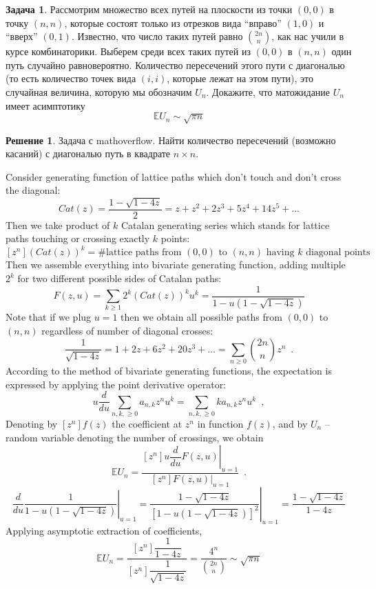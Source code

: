 \documentclass[a5paper]{article}
\theoremstyle{definition}
\newtheorem{problem}{Задача}
\newtheorem*{solution}{Решение}
\begin{document}
\begin{problem}
Рассмотрим множество всех путей на плоскости из точки \( (0,0) \) в точку \(
(n,n) \), которые состоят только из отрезков вида ``вправо'' \( (1,0) \) и ``вверх'' \(
(0,1) \). Известно, что число таких путей равно \( {2n \choose n} \), как нас
учили в курсе комбинаторики. Выберем среди всех таких путей из \( (0,0) \) в \(
(n,n) \) один путь случайно равновероятно. Количество пересечений этого пути с
диагональю (то есть количество точек вида \( (i,i) \), которые лежат на этом
пути), это случайная величина, которую мы обозначим \( U_n \). Докажите, что
матожидание \( U_n \) имеет асимптотику
\begin{equation}
    \mathbb E U_n \sim \sqrt{\pi n}
\end{equation}
\end{problem}

\begin{solution}
Задача с mathoverflow. Найти количество пересечений (возможно касаний) с
диагональю путь в квадрате \( n \times n \).               

Consider generating function of lattice paths which don't touch and don't cross the diagonal:
$$
    Cat(z) = \dfrac{1 - \sqrt{1 - 4z}}{2} = z + z^2 + 2z^3 + 5z^4 + 14z^5 + \ldots
$$
Then we take product of $ k $ Catalan generating series which stands for lattice paths touching or crossing exactly $ k$ points:
$$
    [z^n] (Cat(z))^k = \text{\# lattice paths from $(0,0)$ to $(n,n)$ having $k$ diagonal points}
$$
Then we assemble everything into bivariate generating function, adding multiple $2^k$ for two different possible sides of Catalan paths:
$$
    F(z,u) = \sum_{k \geq 1} 2^k(Cat(z))^k u^k = \dfrac{1}{1 - u(1 - \sqrt{1-4z})}
$$
Note that if we plug $u=1$ then we obtain all possible paths from $(0,0)$ to $(n,n)$ regardless of number of diagonal crosses:
$$
    \dfrac{1}{\sqrt{1-4z}} = 1 + 2z + 6z^2 + 20z^3 + \ldots = \sum_{n \geq 0} {2n \choose n} z^n \enspace .
$$
According to the method of bivariate generating functions, the expectation is expressed by applying the point derivative operator:
$$
    u \dfrac{d}{du} \sum_{n, k, \geq 0} a_{n,k} z^n u^k = 
    \sum_{n, k, \geq 0} k a_{n,k} z^n u^k \enspace ,
$$
Denoting by $[z^n]f(z)$ the coefficient at $z^n$ in function $f(z)$, and by $U_n$ – random variable denoting the number of crossings, we obtain
$$
    \mathbb E U_n = \dfrac{[z^n] \left.u \dfrac{d}{du} F(z,u)\right|_{u=1}}{[z^n] \left.F(z,u)\right|_{u=1}} \enspace .
$$
$$
    \left.\dfrac{d}{du}\dfrac{1}{1 - u(1 - \sqrt{1-4z})} \right|_{u=1} = 
    \left.\dfrac{1 - \sqrt{1-4z}}{\left[1 - u(1 - \sqrt{1-4z})\right]^2} \right|_{u=1} =
    \dfrac{1 - \sqrt{1-4z}}{1 - 4z}
$$
Applying asymptotic extraction of coefficients,
$$
    \mathbb E U_n =
    \dfrac{[z^n] \dfrac{1}{1 - 4z}}
    {[z^n] \dfrac{1}{\sqrt{1 - 4z}}} = 
    \dfrac{4^n}{ {2n \choose n} } \sim \sqrt{ \pi n}
$$
\end{solution}
    
\end{document}
